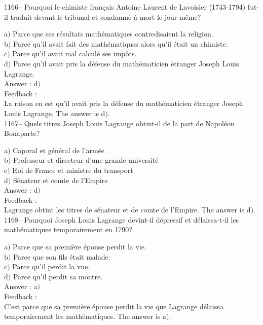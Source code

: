\documentclass[letterpaper, 12pt]{article}
\begin{document}
1166-- Pourquoi le chimiste fran\c cais Antoine Laurent de Lavoisier
(1743-1794) fut-il traduit devant le tribunal et condamn\'e \`a mort
le jour m\^eme?

a$)$ Parce que ses r\'esultats math\'ematiques contredisaient la religion.
\\
b$)$ Parce qu'il avait fait des math\'ematiques alors qu'il \'etait un
chimiste. \\
c$)$ Parce qu'il avait mal calcul\'e ses imp\^ots. \\
d$)$ Parce qu'il avait pris la d\'efense du math\'ematicien \'etranger
Joseph Louis Lagrange.\\

Answer : d$)$\\

Feedback : \\
La raison en est qu'il avait pris la d\'efense du math\'ematicien
\'etranger Joseph Louis Lagrange.
The answer is d$)$.\\

1167-- Quels titres Joseph Louis Lagrange obtint-il de la part de
Napol\'eon Bonaparte?

a$)$ Caporal et g\'en\'eral de l'arm\'ee \\
b$)$ Professeur et directeur d'une grande universit\'e \\
c$)$ Roi de France et ministre du transport \\
d$)$ S\'enateur et comte de l'Empire\\

Answer : d$)$\\

Feedback : \\
Lagrange obtint les titres de s\'enateur et de comte de l'Empire.
The answer is d$)$.\\

1168-- Pourquoi Joseph Louis Lagrange devint-il d\'epressif et
d\'elaissa-t-il les math\'ematiques temporairement en 1790?

a$)$ Parce que sa premi\`ere \'epouse perdit la vie. \\
b$)$ Parce que son fils \'etait malade. \\
c$)$ Parce qu'il perdit la vue. \\
d$)$ Parce qu'il perdit sa montre.\\

Answer : a$)$\\

Feedback : \\
C'est parce que sa premi\`ere \'epouse perdit la vie que Lagrange
d\'elaissa temporairement les math\'ematiques.
The answer is a$)$.\\
\end{document}
